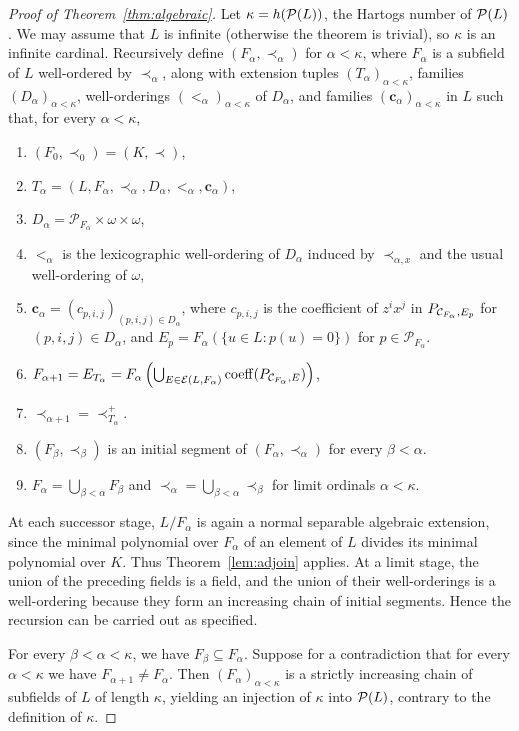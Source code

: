 \begin{proof}[Proof of Theorem~\ref{thm:algebraic}]
Let $\kappa=h(\mathcal P(L))$, the Hartogs number of $\mathcal P(L)$.
We may assume that $L$ is infinite (otherwise the theorem is trivial), so $\kappa$ is an infinite cardinal.
Recursively define $(F_\alpha,\prec_\alpha)$ for $\alpha<\kappa$, where $F_\alpha$ is a subfield of $L$ well-ordered by $\prec_\alpha$, along with extension tuples $(T_\alpha)_{\alpha<\kappa}$, families $(D_\alpha)_{\alpha<\kappa}$, well-orderings $(<_\alpha)_{\alpha<\kappa}$ of $D_\alpha$, and families $(\mathbf c_\alpha)_{\alpha<\kappa}$ in $L$ such that, for every $\alpha<\kappa$,
\begin{enumerate}
    \item $(F_0,\prec_0)=(K,\prec)$,
    \item $T_\alpha=(L,F_\alpha,\prec_\alpha,D_\alpha,<_\alpha,\mathbf c_\alpha)$,
    \item $D_\alpha=\mathscr P_{F_\alpha}\times\omega\times\omega$,
    \item $<_\alpha$ is the lexicographic well-ordering of $D_\alpha$ induced by $\prec_{\alpha,x}$ and the usual well-ordering of $\omega$,
    \item $\mathbf c_\alpha=(c_{p,i,j})_{(p,i,j)\in D_\alpha}$, where $c_{p,i,j}$ is the coefficient of $z^ix^j$ in $P_{\mathcal C_{F_\alpha},E_p}$ for $(p,i,j)\in D_\alpha$, and $E_p=F_\alpha(\{u\in L:p(u)=0\})$ for $p\in\mathscr P_{F_\alpha}$.
    \item $F_{\alpha+1}=E_{T_\alpha}=F_\alpha\left(\bigcup_{E\in\mathcal E(L,F_\alpha)}\operatorname{coeff}(P_{\mathcal C_{F_\alpha},E})\right)$,
    \item $\prec_{\alpha+1}=\prec_{T_\alpha}^+$.
    \item $(F_\beta,\prec_\beta)$ is an initial segment of $(F_{\alpha},\prec_{\alpha})$ for every $\beta<\alpha$.
    \item $F_\alpha=\bigcup_{\beta<\alpha}F_\beta$ and $\prec_\alpha=\bigcup_{\beta<\alpha}\prec_\beta$ for limit ordinals $\alpha<\kappa$.
\end{enumerate}
At each successor stage, $L/F_\alpha$ is again a normal separable
algebraic extension, since the minimal polynomial over $F_\alpha$ of
an element of $L$ divides its minimal polynomial over $K$. Thus
Theorem~\ref{lem:adjoin} applies. At a limit stage, the union of the
preceding fields is a field, and the union of their well-orderings is
a well-ordering because they form an increasing chain of initial
segments. Hence the recursion can be carried out as specified.

For every $\beta<\alpha<\kappa$, we have $F_\beta\subseteq F_\alpha$.
Suppose for a contradiction that for every $\alpha<\kappa$ we have $F_{\alpha+1}\ne F_\alpha$.
Then $(F_\alpha)_{\alpha<\kappa}$ is a strictly increasing chain of subfields of $L$ of length $\kappa$, yielding an injection of $\kappa$ into $\mathcal P(L)$, contrary to the definition of $\kappa$.


\end{proof}
